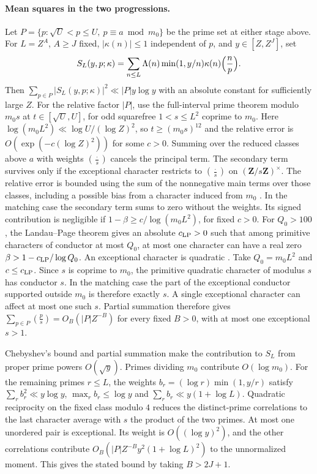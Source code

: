 \paragraph{Mean squares in the two progressions.}
Let \(P=\{p:\sqrt U<p\le U,\ p\equiv a\bmod m_0\}\) be the
prime set at either stage above. For \(L=Z^A\), \(A\ge J\) fixed,
\(|\kappa(n)|\le1\) independent of \(p\), and \(y\in[Z,Z^J]\), set
\[
 S_L(y,p;\kappa)=\sum_{n\le L}\Lambda(n)\min(1,y/n)\kappa(n)
                         \Bigl(\frac np\Bigr).
\]
Then \(\sum_{p\in P}|S_L(y,p;\kappa)|^2\ll |P|y\log y\) with an
absolute constant for sufficiently large \(Z\).
For the relative factor \(|P|\), use the full-interval prime theorem
modulo \(m_0s\) at \(t\in[\sqrt U,U]\), for odd squarefree
\(1<s\le L^2\) coprime to \(m_0\).
Here \(\log(m_0L^2)\ll\log U/(\log Z)^2\), so
\(t\ge(m_0s)^{12}\) and the relative error is
\(O(\exp(-c(\log Z)^2))\) for some \(c>0\).
Summing over the reduced classes above \(a\) with weights
\((\frac{\cdot}{s})\) cancels the principal term. The secondary
term survives only if the exceptional character restricts to
\((\frac{\cdot}{s})\) on \((\mathbf Z/s\mathbf Z)^\times\).
The relative error is bounded using the sum of the nonnegative
main terms over those classes, including a possible bias from
a character induced from \(m_0\)
\cite[arXiv v2, Corollary~1.4 and Remark~1.5]{f1thorner-zaman}.
In the matching case the secondary term sums to zero without
the weights. Its signed contribution is negligible if
\(1-\beta\ge c/\log(m_0L^2)\), for fixed \(c>0\).
For \(Q_0>100\), the Landau--Page theorem gives an absolute
\(c_{\rm LP}>0\) such that among primitive characters of conductor
at most \(Q_0\), at most one character can have a real zero
\(\beta>1-c_{\rm LP}/\log Q_0\). An exceptional character is
quadratic \cite[Landau--Page; the real-axis case of Lemma~7.1 in the cited account]{f1page}.
Take \(Q_0=m_0L^2\) and \(c\le c_{\rm LP}\).
Since \(s\) is coprime to \(m_0\), the primitive quadratic
character of modulus \(s\) has conductor \(s\). In the matching
case the part of the exceptional conductor supported outside
\(m_0\) is therefore exactly \(s\). A single exceptional
character can affect at most one such \(s\).
Partial summation therefore gives
\(\sum_{p\in P}(\frac ps)=O_B(|P|Z^{-B})\) for every fixed \(B>0\),
with at most one exceptional \(s>1\).

Chebyshev's bound and partial summation make the contribution to
\(S_L\) from proper prime powers \(O(\sqrt y)\). Primes dividing
\(m_0\) contribute \(O(\log m_0)\).
For the remaining primes \(r\le L\), the weights
\(b_r=(\log r)\min(1,y/r)\) satisfy \(\sum_r b_r^2\ll y\log y\),
\(\max_r b_r\le\log y\) and \(\sum_r b_r\ll y(1+\log L)\).
Quadratic reciprocity on the fixed class modulo \(4\) reduces
the distinct-prime correlations to the last character average
with \(s\) the product of the two primes. At most one unordered
pair is exceptional. Its weight is \(O((\log y)^2)\), and the
other correlations contribute \(O_B(|P| Z^{-B} y^2(1+\log L)^2)\)
to the unnormalized moment. This gives the stated bound by
taking \(B>2J+1\).

